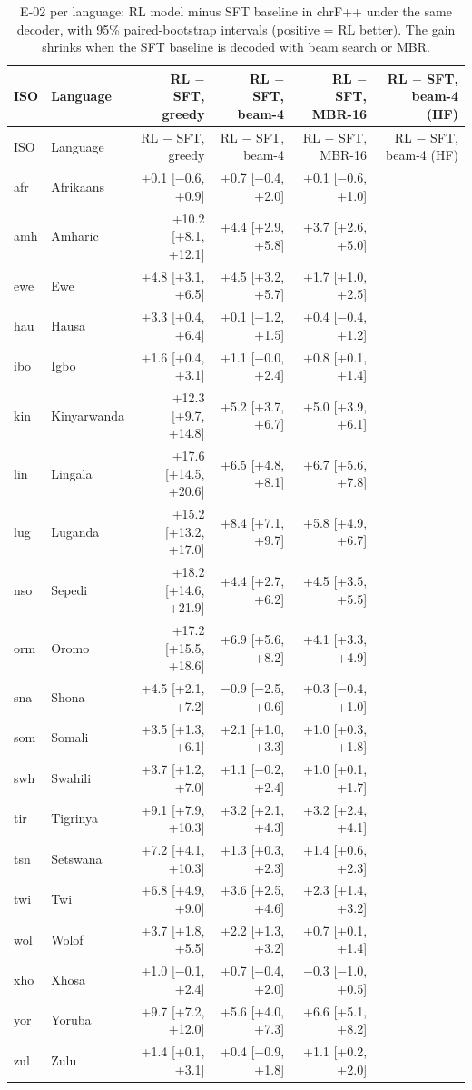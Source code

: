 {\scriptsize\setlength{\tabcolsep}{1.5pt}
\begin{longtable}{@{}llrrrr@{}}
\caption{E-02 per language: RL model minus SFT baseline in chrF++ under the same decoder, with 95\% paired-bootstrap intervals (positive = RL better). The gain shrinks when the SFT baseline is decoded with beam search or MBR.}\label{tab:dec-rl-minus-sft}\\
\toprule
ISO & Language & RL $-$ SFT, greedy & RL $-$ SFT, beam-4 & RL $-$ SFT, MBR-16 & RL $-$ SFT, beam-4 (HF) \\
\midrule\endfirsthead
\toprule
ISO & Language & RL $-$ SFT, greedy & RL $-$ SFT, beam-4 & RL $-$ SFT, MBR-16 & RL $-$ SFT, beam-4 (HF) \\
\midrule\endhead
\midrule\endfoot
\bottomrule\endlastfoot
afr & Afrikaans & +0.1 [$-$0.6, +0.9] & +0.7 [$-$0.4, +2.0] & +0.1 [$-$0.6, +1.0] \\
amh & Amharic & +10.2 [+8.1, +12.1] & +4.4 [+2.9, +5.8] & +3.7 [+2.6, +5.0] \\
ewe & Ewe & +4.8 [+3.1, +6.5] & +4.5 [+3.2, +5.7] & +1.7 [+1.0, +2.5] \\
hau & Hausa & +3.3 [+0.4, +6.4] & +0.1 [$-$1.2, +1.5] & +0.4 [$-$0.4, +1.2] \\
ibo & Igbo & +1.6 [+0.4, +3.1] & +1.1 [$-$0.0, +2.4] & +0.8 [+0.1, +1.4] \\
kin & Kinyarwanda & +12.3 [+9.7, +14.8] & +5.2 [+3.7, +6.7] & +5.0 [+3.9, +6.1] \\
lin & Lingala & +17.6 [+14.5, +20.6] & +6.5 [+4.8, +8.1] & +6.7 [+5.6, +7.8] \\
lug & Luganda & +15.2 [+13.2, +17.0] & +8.4 [+7.1, +9.7] & +5.8 [+4.9, +6.7] \\
nso & Sepedi & +18.2 [+14.6, +21.9] & +4.4 [+2.7, +6.2] & +4.5 [+3.5, +5.5] \\
orm & Oromo & +17.2 [+15.5, +18.6] & +6.9 [+5.6, +8.2] & +4.1 [+3.3, +4.9] \\
sna & Shona & +4.5 [+2.1, +7.2] & $-$0.9 [$-$2.5, +0.6] & +0.3 [$-$0.4, +1.0] \\
som & Somali & +3.5 [+1.3, +6.1] & +2.1 [+1.0, +3.3] & +1.0 [+0.3, +1.8] \\
swh & Swahili & +3.7 [+1.2, +7.0] & +1.1 [$-$0.2, +2.4] & +1.0 [+0.1, +1.7] \\
tir & Tigrinya & +9.1 [+7.9, +10.3] & +3.2 [+2.1, +4.3] & +3.2 [+2.4, +4.1] \\
tsn & Setswana & +7.2 [+4.1, +10.3] & +1.3 [+0.3, +2.3] & +1.4 [+0.6, +2.3] \\
twi & Twi & +6.8 [+4.9, +9.0] & +3.6 [+2.5, +4.6] & +2.3 [+1.4, +3.2] \\
wol & Wolof & +3.7 [+1.8, +5.5] & +2.2 [+1.3, +3.2] & +0.7 [+0.1, +1.4] \\
xho & Xhosa & +1.0 [$-$0.1, +2.4] & +0.7 [$-$0.4, +2.0] & $-$0.3 [$-$1.0, +0.5] \\
yor & Yoruba & +9.7 [+7.2, +12.0] & +5.6 [+4.0, +7.3] & +6.6 [+5.1, +8.2] \\
zul & Zulu & +1.4 [+0.1, +3.1] & +0.4 [$-$0.9, +1.8] & +1.1 [+0.2, +2.0] \\
\end{longtable}}
